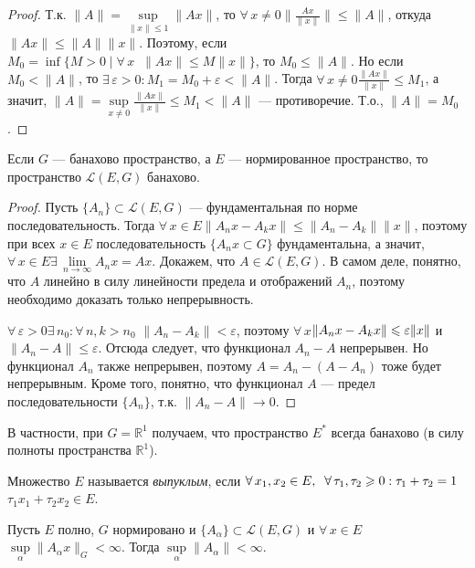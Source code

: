 \documentclass[10pt,titlepage, a4paper]{article}
\begin{document}
\begin{proof}
Т.к. $\|A\|=\sup\limits_{\|x\|\leqslant 1}\|Ax\|$, то
$\forall\,x\neq 0$\;\;$\Big\|\frac{Ax}{\|x\|}\Big\|\leqslant\|A\|$,
откуда $\|Ax\|\leqslant\|A\|\|x\|$. Поэтому, если $M_0=\inf\{M>0\mid
\forall\,x\;\;\|Ax\|\leqslant M\|x\|\}$, то $M_0\leqslant\|A\|$. Но
если $M_0<\|A\|$, то
$\exists\,\varepsilon>0:M_1=M_0+\varepsilon<\|A\|$. Тогда
$\forall\,x\neq 0$\;\;$\frac{\|Ax\|}{\|x\|}\leqslant M_1$, а значит,
$\|A\|=\sup\limits_{x\neq0}\frac{\|Ax\|}{\|x\|}\leqslant M_1<\|A\|$
--- противоречие. Т.о., $\|A\|=M_0$.
\end{proof}

\begin{theorem}
Если $G$ --- банахово пространство, а $E$ --- нормированное
пространство, то пространство $\mathcal{L}(E,G)$ банахово.
\end{theorem}

\begin{proof}
Пусть $\{A_n\}\subset\mathcal{L}(E,G)$ --- фундаментальная по норме
последовательность. Тогда $\forall\,x\in
E$\;\;$\|A_nx-A_kx\|\leqslant \|A_n-A_k\|\|x\|$, поэтому при всех
$x\in E$ последовательность $\{A_nx\subset G\}$ фундаментальна, а
значит, $\forall\,x\in E$\;\;$\exists\,\lim\limits_{n\to\infty}
A_nx=Ax$. Докажем, что $A\in\mathcal{L}(E,G)$. В самом деле,
понятно, что $A$ линейно в силу линейности предела и отображений
$A_n$, поэтому необходимо доказать только непрерывность.

$\forall\,\varepsilon>0$\;\;$\exists\,n_0:\forall\,n,k>n_0$\;\;
$\|A_n-A_k\|<\varepsilon$, поэтому
$\forall\,x$\;\;$\|A_nx-A_kx\|\p\leqslant\varepsilon\|x\|$ и
$\|A_n-A\|\leqslant\varepsilon$. Отсюда следует, что функционал
$A_n-A$ непрерывен. Но функционал $A_n$ также непрерывен, поэтому
$A=A_n-(A-A_n)$ тоже будет непрерывным. Кроме того, понятно, что
функционал $A$ --- предел последовательности $\{A_n\}$, т.к.
$\|A_n-A\|\to 0$.
\end{proof}

В частности, при $G=\mathbb{R}^1$ получаем, что пространство $E^*$
всегда банахово (в силу полноты пространства $\mathbb{R}^1$).

\begin{defen}
Множество $E$ называется \emph{выпуклым}, если
$\forall\,x_1,x_2\p\in
E,\;\;\forall\,\tau_1,\tau_2\geqslant0:\tau_1+\tau_2=1$\;\;$\tau_1x_1+\tau_2x_2\in
E$.
\end{defen}

\begin{theorem}
Пусть $E$ полно, $G$ нормировано и
$\{A_\alpha\}\subset\mathcal{L}(E,G)$ и $\forall\,x\in E$
\;\;$\sup\limits_\alpha\|A_\alpha x\|_G<\infty$. Тогда
$\sup\limits_\alpha\|A_\alpha\|<\infty$.
\end{theorem}
\end{document}
